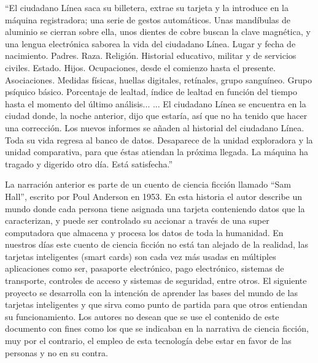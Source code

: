 \begin{prefacio}

\begin{itshape}
“El ciudadano Línea saca su billetera, extrae su tarjeta y la introduce en la máquina registradora; una serie de gestos automáticos. Unas mandíbulas de aluminio se cierran sobre ella, unos dientes de cobre buscan la clave magnética, y una lengua electrónica saborea la vida del ciudadano Línea.
Lugar y fecha de nacimiento. Padres. Raza. Religión. Historial educativo, militar y de servicios civiles. Estado. Hijos. Ocupaciones, desde el comienzo hasta el presente. Asociaciones. Medidas físicas, huellas digitales, retínales, grupo sanguíneo. Grupo psíquico básico. Porcentaje de lealtad, índice de lealtad en función del tiempo hasta el momento del último análisis...
... El ciudadano Línea se encuentra en la ciudad donde, la noche anterior, dijo que estaría, así que no ha tenido que hacer una corrección.
Los nuevos informes se añaden al historial del ciudadano Línea. Toda su vida regresa al banco de datos. Desaparece de la unidad exploradora y la unidad comparativa, para que éstas atiendan la próxima llegada.
La máquina ha tragado y digerido otro día. Está satisfecha.”

\end{itshape}
\bigskip

La narración anterior es parte de un cuento de ciencia ficción llamado “Sam Hall”, escrito por Poul Anderson en 1953. En esta historia el autor describe un mundo donde cada persona tiene asignada una tarjeta conteniendo datos que la caracterizan, y puede ser controlado su accionar a través de una super computadora que almacena y procesa los datos de toda la humanidad. 
En nuestros días este cuento de ciencia ficción no está tan alejado de la realidad, las tarjetas inteligentes (smart cards) son cada vez más usadas en múltiples aplicaciones como ser, pasaporte electrónico, pago electrónico, sistemas de transporte, controles de acceso y sistemas de seguridad, entre otros.
El siguiente proyecto se desarrolla con la intención de aprender las bases del mundo de las tarjetas inteligentes y que sirva como punto de partida para que otros entiendan su funcionamiento. 
Los autores no desean que se use el contenido de este documento con fines como los que se indicaban en la narrativa de ciencia ficción, muy por el contrario, el empleo de esta tecnología debe estar en favor de las personas y no en su contra.

\end{prefacio}